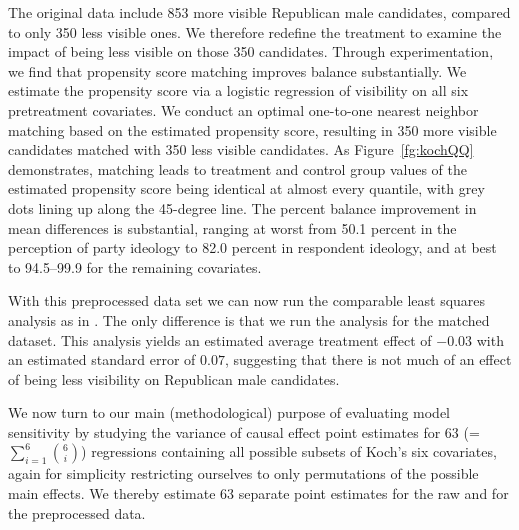 \documentclass[11pt,titlepage]{article}
\begin{document}
The original data include 853 more visible Republican male candidates,
compared to only 350 less visible ones.  We therefore redefine the
treatment to examine the impact of being less visible on those 350
candidates.  Through experimentation, we find that propensity score
matching improves balance substantially.  We estimate the propensity
score via a logistic regression of visibility on all six pretreatment
covariates.  We conduct an optimal one-to-one nearest neighbor
matching based on the estimated propensity score, resulting in 350
more visible candidates matched with 350 less visible candidates.  As
Figure~\ref{fg:kochQQ} demonstrates, matching leads to treatment and
control group values of the estimated propensity score being identical
at almost every quantile, with grey dots lining up along the 45-degree
line.  The percent balance improvement in mean differences is
substantial, ranging at worst from 50.1 percent in the perception of
party ideology to 82.0 percent in respondent ideology, and at best to
94.5--99.9 for the remaining covariates.

With this preprocessed data set we can now run the comparable least
squares analysis as in \citet{Koch02}.  The only difference is that we
run the analysis for the matched dataset.  This analysis yields an
estimated average treatment effect of $-0.03$ with an estimated
standard error of $0.07$, suggesting that there is not much of an
effect of being less visibility on Republican male candidates.

We now turn to our main (methodological) purpose of evaluating model
sensitivity by studying the variance of causal effect point estimates
for 63 (=$\sum_{i=1}^6 {6 \choose i}$) regressions containing all
possible subsets of Koch's six covariates, again for simplicity
restricting ourselves to only permutations of the possible main
effects.  We thereby estimate 63 separate point estimates for the raw
and for the preprocessed data.
\end{document}
